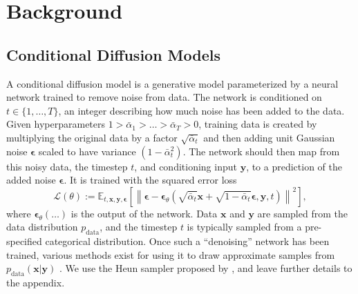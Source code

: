 \section{Background}
\subsection{Conditional Diffusion Models}
A conditional diffusion model \citep{tashiro2021csdi, ddpm, sohldickstein} is a generative model parameterized by a neural network trained to remove noise from data. The network is conditioned on $t \in \{ 1, \ldots, T\}$, an integer describing how much noise has been added to the data. Given hyperparameters $1 > \bar{\alpha}_1 > \ldots > \bar{\alpha}_T > 0$, training data is created by multiplying the original data by a factor $\sqrt{\bar{\alpha}_t}$ and then adding unit Gaussian noise $\boldsymbol{\epsilon}$ scaled to have variance $(1-\bar{\alpha}_t^2)$. The network should then map from this noisy data, the timestep $t$, and conditioning input $\mathbf{y}$, to a prediction of the added noise $\boldsymbol{\epsilon}$. It is trained with the squared error loss
\begin{equation}
    \mathcal{L}(\theta):=\mathbb{E}_{t, \mathbf{x}, \mathbf{y}, \boldsymbol{\epsilon}}\left[\left\|\boldsymbol{\epsilon}-\boldsymbol{\epsilon}_\theta\left(\sqrt{\bar{\alpha}_t} \mathbf{x}+\sqrt{1-\bar{\alpha}_t} \boldsymbol{\epsilon}, \mathbf{y}, t\right)\right\|^2\right],
    \label{eq:lsimple}
\end{equation}
where $\boldsymbol{\epsilon}_\theta(\ldots)$ is the output of the network. Data $\mathbf{x}$ and $\mathbf{y}$ are sampled from the data distribution $p_\text{data}$, and the timestep $t$ is typically sampled from a pre-specified categorical distribution. Once such a ``denoising'' network has been trained, various methods exist for using it to draw approximate samples from $p_\text{data}(\mathbf{x}|\mathbf{y})$ \citep{ddpm,sohldickstein,tashiro2021csdi,song2020score,karras2022elucidating}. We use the Heun sampler proposed by \citet{karras2022elucidating}, and leave further details to the appendix.

